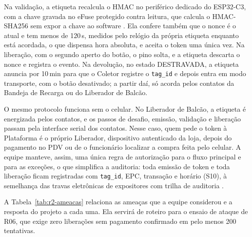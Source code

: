 Na validação, a etiqueta recalcula o HMAC no periférico dedicado do ESP32-C3, com a chave gravada no eFuse protegido contra leitura, que calcula o HMAC-SHA256 sem expor a chave ao software \cite{espressif2026hmac}. Ela confere também que o nonce é o atual e tem menos de 120\,s, medidos pelo relógio da própria etiqueta enquanto está acordada, o que dispensa hora absoluta, e aceita o token uma única vez. Na liberação, com o segundo aperto do botão, o pino solta, e a etiqueta descarta o nonce e registra o evento. Na devolução, no estado DESTRAVADA, a etiqueta anuncia por 10\,min para que o Coletor registre o \texttt{tag\_id} e depois entra em modo transporte, com o botão desativado; a partir daí, só acorda pelos contatos da Bandeja de Recarga ou do Liberador de Balcão.

O mesmo protocolo funciona sem o celular. No Liberador de Balcão, a etiqueta é energizada pelos contatos, e os passos de desafio, emissão, validação e liberação passam pela interface serial dos contatos. Nesse caso, quem pede o token à Plataforma é o próprio Liberador, dispositivo autenticado da loja, depois do pagamento no PDV ou de o funcionário localizar a compra feita pelo celular. A equipe manteve, assim, uma única regra de autorização para o fluxo principal e para as exceções, o que simplifica a auditoria: toda emissão de token e toda liberação ficam registradas com \texttt{tag\_id}, EPC, transação e horário (S10), à semelhança das travas eletrônicas de expositores com trilha de auditoria \cite{invue2026locks}.

A Tabela~\ref{tab:r2-ameacas} relaciona as ameaças que a equipe considerou e a resposta do projeto a cada uma. Ela servirá de roteiro para o ensaio de ataque de R06, que exige zero liberações sem pagamento confirmado em pelo menos 200 tentativas.


